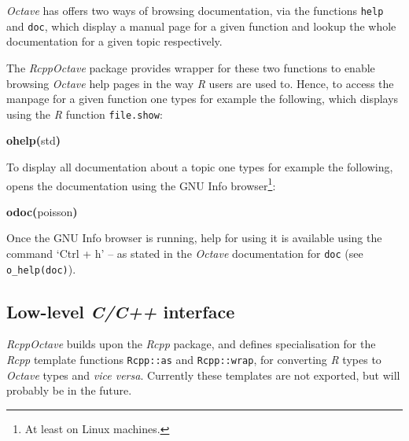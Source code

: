 \documentclass[english,10pt,a4paper]{article}\usepackage{graphicx, color}
\makeatletter
\newcommand{\hlfunctioncall}[1]{\textcolor[rgb]{0.501960784313725,0,0.329411764705882}{\textbf{#1}}}%
\newcommand{\hlkeyword}[1]{\textcolor[rgb]{0,0,0}{\textbf{#1}}}%
\newcommand{\hlsymbol}[1]{\textcolor[rgb]{0,0,0}{#1}}%
\newenvironment{kframe}{%
 \def\FrameCommand##1{\hskip\@totalleftmargin \hskip-\fboxsep
 \colorbox{shadecolor}{##1}\hskip-\fboxsep
     \hskip-\linewidth \hskip-\@totalleftmargin \hskip\columnwidth}%
 \MakeFramed {\advance\hsize-\width
   \@totalleftmargin\z@ \linewidth\hsize
   \@setminipage}}%
 {\par\unskip\endMakeFramed}
\newenvironment{knitrout}{}{} %
\let\proglang=\textit
\let\code=\texttt
\newcommand{\pkgname}[1]{\textit{#1}\xspace}
\newcommand{\Rpkg}[1]{\pkgname{#1} package\xspace}
\newcommand{\R}{\proglang{R}\xspace}
\newcommand{\octave}{\proglang{Octave}\xspace}
\makeatother
\begin{document}
\octave has offers two ways of browsing documentation, via the functions
\code{help} and \code{doc}, which display a manual page for a given function and
lookup the whole documentation for a given topic respectively.

The \Rpkg{RcppOctave} provides wrapper for these two functions to enable
browsing \octave help pages in the way \R users are used to.
Hence, to access the manpage for a given function one types for example the
following, which displays using the \R function \code{file.show}:
\begin{knitrout}
\color{fgcolor}\begin{kframe}
\begin{flushleft}
\ttfamily\noindent
\hlfunctioncall{o\usebox{\hlnormalsizeboxunderscore}help}\hlkeyword{(}\hlsymbol{std}\hlkeyword{)}\mbox{}
\normalfont
\end{flushleft}
\end{kframe}
\end{knitrout}


To display all documentation about a topic one types for example the following,
opens the documentation using the GNU Info browser\footnote{At least on
Linux machines.}:
\begin{knitrout}
\color{fgcolor}\begin{kframe}
\begin{flushleft}
\ttfamily\noindent
\hlfunctioncall{o\usebox{\hlnormalsizeboxunderscore}doc}\hlkeyword{(}\hlsymbol{poisson}\hlkeyword{)}\mbox{}
\normalfont
\end{flushleft}
\end{kframe}
\end{knitrout}

Once the GNU Info browser is running, help for using it is available using the
command `Ctrl + h' -- as stated in the \octave documentation for \code{doc} (see
\code{o\_help(doc)}).

\subsection{Low-level \textit{C/C++} interface}

\pkgname{RcppOctave} builds upon the \Rpkg{Rcpp}, and defines specialisation
for the \proglang{Rcpp} template functions \code{Rcpp::as} and
\code{Rcpp::wrap}, for converting \proglang{R} types to \octave
types and \emph{vice versa}.
Currently these templates are not exported, but will probably be in the future.
\end{document}
